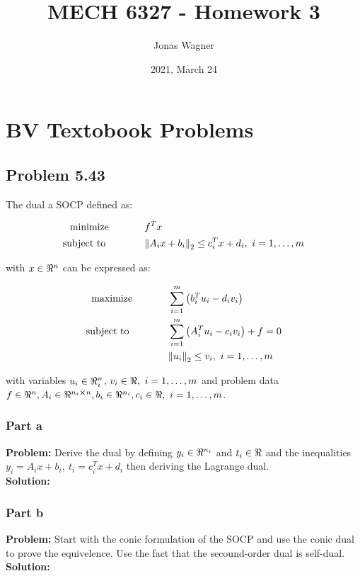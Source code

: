 \documentclass[letter]{article}
\title{MECH 6327 - Homework 3}
\author{Jonas Wagner}
\date{2021, March 24}
\newcommand{\optpblm}[3][eq:default]{
	\begin{equation}\label{#1}
		\begin{aligned}
			\text{minimize} \hspace{0.5in} &#2\vspace{5pt}\\
			\text{subject to \hspace{0.5in}} &#3
		\end{aligned}	
	\end{equation}
}
\newcommand{\maxpblm}[3][eq:default]{
	\begin{equation}\label{#1}
		\begin{aligned}
			\text{maximize} \hspace{0.5in} &#2\vspace{5pt}\\
			\text{subject to \hspace{0.5in}} &#3
		\end{aligned}	
	\end{equation}
}
\begin{document}
\maketitle

\newpage
\tableofcontents

\newpage
\section*{BV Textobook Problems}
\subsection{Problem 5.43}
The dual a SOCP defined as:
\optpblm{f^T x}{\norm{A_i x + b_i}_2 \leq c_i^T x + d_i, \ i = 1,\dots,m}
with $x \in \real^n$ can be expressed as:
\maxpblm{\sum_{i=1}^m \qty(b_i^T u_i - d_i v_i)}{
	  \sum_{i=1}^m \qty(A_i^T u_i - c_i v_i) + f = 0\\
	& \norm{u_i}_2 \leq v_i, \ i = 1,\dots,m}
with variables $u_i \in \real^n_i$, $v_i \in \real, \ i=1,\dots,m$ and problem data $f\in \real^n, A_i \in \real^{n_i \cross n}, b_i \in \real^{n_i}, c_i \in \real, \ i = 1,\dots,m$.\\

\subsubsection{Part a}
\textbf{Problem:}
Derive the dual by defining $y_i \in \real^{n_i}$ and $t_i \in \real$ and the inequalities $y_i = A_i x + b_i, \ t_i = c_i^T x + d_i$ then deriving the Lagrange dual.\\

\noindent
\textbf{Solution:}








\subsubsection{Part b}
\textbf{Problem:}
Start with the conic formulation of the SOCP and use the conic dual to prove the equivelence. Use the fact that the secound-order dual is self-dual.\\

\noindent
\textbf{Solution:}
\end{document}
